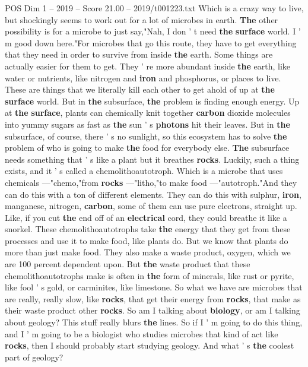 \begin{textsample}{POS Dim 1 – 2019 – Score 21.00 – 2019/t001223.txt}
Which is a crazy way to live, but shockingly seems to work out for a lot of microbes in earth. \textbf{The} other possibility is for a microbe to just say,"Nah, I don ' t need \textbf{the} \textbf{surface} world.
I ' m good down here."For microbes that go this route, they have to get everything that they need in order to survive from inside \textbf{the} earth.
Some things are actually easier for them to get.
They ' re more abundant inside \textbf{the} earth, like water or nutrients, like nitrogen and \textbf{iron} and phosphorus, or places to live.
These are things that we literally kill each other to get ahold of up at \textbf{the} \textbf{surface} world.
But in \textbf{the} subsurface, \textbf{the} problem is finding enough energy.
Up at \textbf{the} \textbf{surface}, plants can chemically knit together \textbf{carbon} dioxide molecules into yummy sugars as fast as \textbf{the} sun ' s \textbf{photons} hit their leaves.
But in \textbf{the} subsurface, of course, there ' s no sunlight, so this ecosystem has to solve \textbf{the} problem of who is going to make \textbf{the} food for everybody else. \textbf{The} subsurface needs something that ' s like a plant but it breathes \textbf{rocks}.
Luckily, such a thing exists, and it ' s called a chemolithoautotroph.
Which is a microbe that uses chemicals —"chemo,"from \textbf{rocks} —"litho,"to make food —"autotroph."And they can do this with a ton of different elements.
They can do this with sulphur, \textbf{iron}, manganese, nitrogen, \textbf{carbon}, some of them can use pure electrons, straight up.
Like, if you cut \textbf{the} end off of an \textbf{electrical} cord, they could breathe it like a snorkel.
These chemolithoautotrophs take \textbf{the} energy that they get from these processes and use it to make food, like plants do.
But we know that plants do more than just make food.
They also make a waste product, oxygen, which we are 100 percent dependent upon.
But \textbf{the} waste product that these chemolithoautotrophs make is often in \textbf{the} form of minerals, like rust or pyrite, like fool ' s gold, or carminites, like limestone.
So what we have are microbes that are really, really slow, like \textbf{rocks}, that get their energy from \textbf{rocks}, that make as their waste product other \textbf{rocks}.
So am I talking about \textbf{biology}, or am I talking about geology?
This stuff really blurs \textbf{the} lines.
So if I ' m going to do this thing, and I ' m going to be a biologist who studies microbes that kind of act like \textbf{rocks}, then I should probably start studying geology.
And what ' s \textbf{the} coolest part of geology?

\end{textsample}
